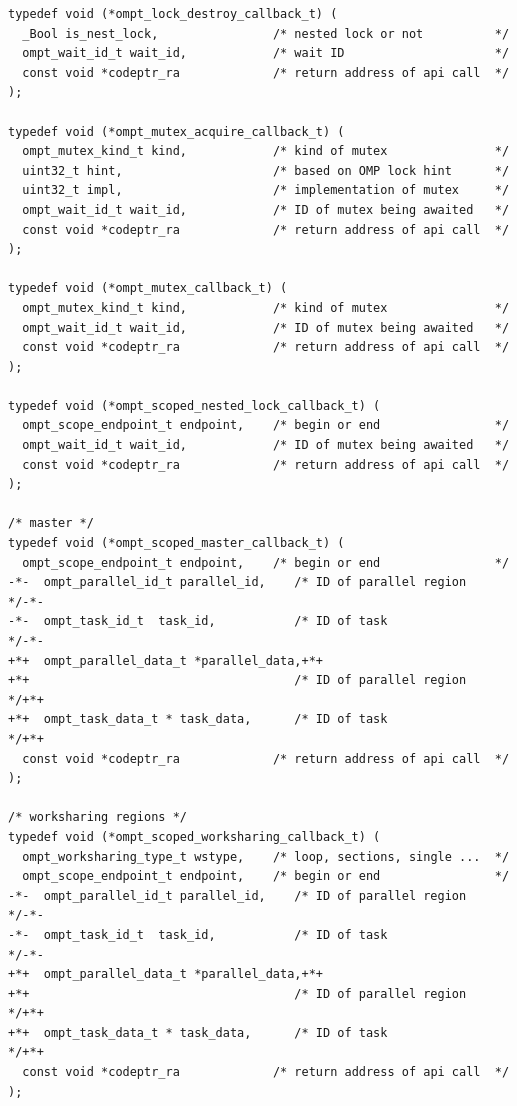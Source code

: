 \documentclass{article}
\begin{document}
\begin{lstlisting}
typedef void (*ompt_lock_destroy_callback_t) (
  _Bool is_nest_lock,                /* nested lock or not          */
  ompt_wait_id_t wait_id,            /* wait ID                     */
  const void *codeptr_ra             /* return address of api call  */
);

typedef void (*ompt_mutex_acquire_callback_t) ( 
  ompt_mutex_kind_t kind,            /* kind of mutex               */
  uint32_t hint,                     /* based on OMP lock hint      */
  uint32_t impl,                     /* implementation of mutex     */
  ompt_wait_id_t wait_id,            /* ID of mutex being awaited   */
  const void *codeptr_ra             /* return address of api call  */          
);

typedef void (*ompt_mutex_callback_t) ( 
  ompt_mutex_kind_t kind,            /* kind of mutex               */ 
  ompt_wait_id_t wait_id,            /* ID of mutex being awaited   */
  const void *codeptr_ra             /* return address of api call  */          
);

typedef void (*ompt_scoped_nested_lock_callback_t) ( 
  ompt_scope_endpoint_t endpoint,    /* begin or end                */ 
  ompt_wait_id_t wait_id,            /* ID of mutex being awaited   */
  const void *codeptr_ra             /* return address of api call  */          
);

/* master */
typedef void (*ompt_scoped_master_callback_t) ( 
  ompt_scope_endpoint_t endpoint,    /* begin or end                */
-*-  ompt_parallel_id_t parallel_id,    /* ID of parallel region       */-*-
-*-  ompt_task_id_t  task_id,           /* ID of task                  */-*-
+*+  ompt_parallel_data_t *parallel_data,+*+
+*+                                     /* ID of parallel region       */+*+
+*+  ompt_task_data_t * task_data,      /* ID of task                  */+*+
  const void *codeptr_ra             /* return address of api call  */
);

/* worksharing regions */
typedef void (*ompt_scoped_worksharing_callback_t) (
  ompt_worksharing_type_t wstype,    /* loop, sections, single ...  */
  ompt_scope_endpoint_t endpoint,    /* begin or end                */
-*-  ompt_parallel_id_t parallel_id,    /* ID of parallel region       */-*-
-*-  ompt_task_id_t  task_id,           /* ID of task                  */-*-
+*+  ompt_parallel_data_t *parallel_data,+*+
+*+                                     /* ID of parallel region       */+*+
+*+  ompt_task_data_t * task_data,      /* ID of task                  */+*+
  const void *codeptr_ra             /* return address of api call  */
);


\end{lstlisting}
\end{document}
